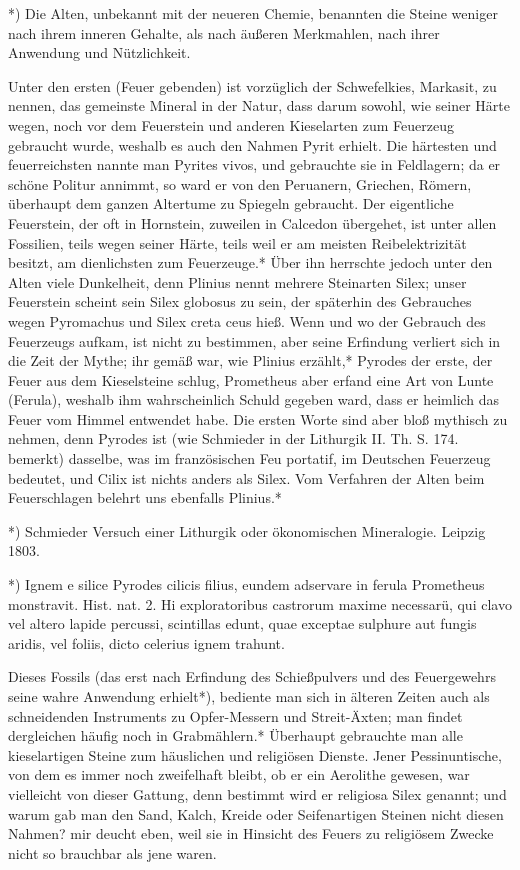 \documentclass[a4paper, 11pt, oneside, polutonikogreek, german]{article}
\begin{document}
*) Die Alten, unbekannt mit der neueren Chemie, benannten die Steine weniger nach ihrem inneren Gehalte, als nach äußeren Merkmahlen, nach ihrer Anwendung und Nützlichkeit.

Unter den ersten (Feuer gebenden) ist vorzüglich der Schwefelkies, Markasit, zu nennen, das gemeinste Mineral in der Natur, dass darum sowohl, wie seiner Härte wegen, noch vor dem Feuerstein und anderen Kieselarten zum Feuerzeug gebraucht wurde, weshalb es auch den Nahmen Pyrit erhielt. Die härtesten und feuerreichsten nannte man Pyrites vivos, und gebrauchte sie in Feldlagern; da er schöne Politur annimmt, so ward er von den Peruanern, Griechen, Römern, überhaupt dem ganzen Altertume zu Spiegeln gebraucht. Der eigentliche Feuerstein, der oft in Hornstein, zuweilen in Calcedon übergehet, ist unter allen Fossilien, teils wegen seiner Härte, teils weil er am meisten Reibelektrizität besitzt, am dienlichsten zum Feuerzeuge.* Über ihn herrschte jedoch unter den Alten viele Dunkelheit, denn Plinius nennt mehrere Steinarten Silex; unser Feuerstein scheint sein Silex globosus zu sein, der späterhin des Gebrauches wegen Pyromachus und Silex creta ceus hieß. Wenn und wo der Gebrauch des Feuerzeugs aufkam, ist nicht zu bestimmen, aber seine Erfindung verliert sich in die Zeit der Mythe; ihr gemäß war, wie Plinius erzählt,* Pyrodes der erste, der Feuer aus dem Kieselsteine schlug, Prometheus aber erfand eine Art von Lunte (Ferula), weshalb ihm wahrscheinlich Schuld gegeben ward, dass er heimlich das Feuer vom Himmel entwendet habe. Die ersten Worte sind aber bloß mythisch zu nehmen, denn Pyrodes ist (wie Schmieder in der Lithurgik II. Th. S. 174. bemerkt) dasselbe, was im französischen Feu portatif, im Deutschen Feuerzeug bedeutet, und Cilix ist nichts anders als Silex. Vom Verfahren der Alten beim Feuerschlagen belehrt uns ebenfalls Plinius.*

*) Schmieder Versuch einer Lithurgik oder ökonomischen Mineralogie. Leipzig 1803.

*) Ignem e silice Pyrodes cilicis filius, eundem adservare in ferula Prometheus monstravit. Hist. nat.
2. Hi exploratoribus castrorum maxime necessarü, qui clavo vel altero lapide percussi, scintillas edunt, quae exceptae sulphure aut fungis aridis, vel foliis, dicto celerius ignem trahunt.

Dieses Fossils (das erst nach Erfindung des Schießpulvers und des Feuergewehrs seine wahre Anwendung erhielt*), bediente man sich in älteren Zeiten auch als schneidenden Instruments zu Opfer-Messern und Streit-Äxten; man findet dergleichen häufig noch in Grabmählern.* Überhaupt gebrauchte man alle kieselartigen Steine zum häuslichen und religiösen Dienste. Jener Pessinuntische, von dem es immer noch zweifelhaft bleibt, ob er ein Aerolithe gewesen, war vielleicht von dieser Gattung, denn bestimmt wird er religiosa Silex genannt; und warum gab man den Sand, Kalch, Kreide oder Seifenartigen Steinen nicht diesen Nahmen? mir deucht eben, weil sie in Hinsicht des Feuers zu religiösem Zwecke nicht so brauchbar als jene waren.
\end{document}
